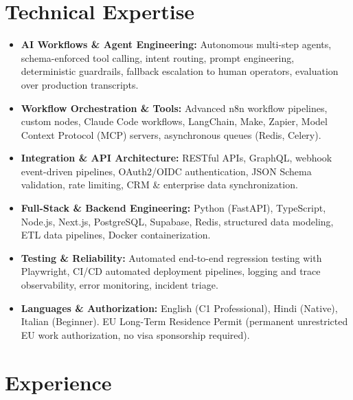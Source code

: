 \documentclass[10pt,a4paper]{article}
\begin{document}
\section{Technical Expertise}
\begin{itemize}
  \item \textbf{AI Workflows \& Agent Engineering:} Autonomous multi-step agents, schema-enforced tool calling, intent routing, prompt engineering, deterministic guardrails, fallback escalation to human operators, evaluation over production transcripts.
  \item \textbf{Workflow Orchestration \& Tools:} Advanced n8n workflow pipelines, custom nodes, Claude Code workflows, LangChain, Make, Zapier, Model Context Protocol (MCP) servers, asynchronous queues (Redis, Celery).
  \item \textbf{Integration \& API Architecture:} RESTful APIs, GraphQL, webhook event-driven pipelines, OAuth2/OIDC authentication, JSON Schema validation, rate limiting, CRM \& enterprise data synchronization.
  \item \textbf{Full-Stack \& Backend Engineering:} Python (FastAPI), TypeScript, Node.js, Next.js, PostgreSQL, Supabase, Redis, structured data modeling, ETL data pipelines, Docker containerization.
  \item \textbf{Testing \& Reliability:} Automated end-to-end regression testing with Playwright, CI/CD automated deployment pipelines, logging and trace observability, error monitoring, incident triage.
  \item \textbf{Languages \& Authorization:} English (C1 Professional), Hindi (Native), Italian (Beginner). EU Long-Term Residence Permit (permanent unrestricted EU work authorization, no visa sponsorship required).
\end{itemize}

\section{Experience}
\end{document}
